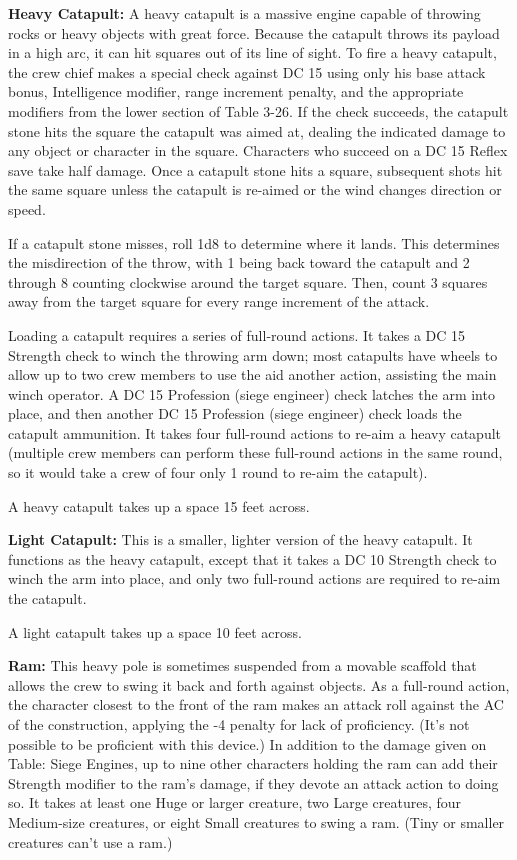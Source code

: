 \textbf{Heavy Catapult:} A heavy catapult is a massive engine capable of throwing 
rocks or heavy objects with great force. Because the catapult throws its payload 
in a high arc, it can hit squares out of its line of sight. To fire a heavy catapult, 
the crew chief makes a special check against DC 15 using only his base attack bonus, 
Intelligence modifier, range increment penalty, and the appropriate modifiers from 
the lower section of Table 3-26. If the check succeeds, the catapult stone hits 
the square the catapult was aimed at, dealing the indicated damage to any object 
or character in the square. Characters who succeed on a DC 15 Reflex save take 
half damage. Once a catapult stone hits a square, subsequent shots hit the same 
square unless the catapult is re-aimed or the wind changes direction or speed.

If a catapult stone misses, roll 1d8 to determine where it lands. This determines 
the misdirection of the throw, with 1 being back toward the catapult and 2 through 
8 counting clockwise around the target square. Then, count 3 squares away from 
the target square for every range increment of the attack.

Loading a catapult requires a series of full-round actions. It takes a DC 15 Strength 
check to winch the throwing arm down; most catapults have wheels to allow up to 
two crew members to use the aid another action, assisting the main winch operator. 
A DC 15 Profession (siege engineer) check latches the arm into place, and then 
another DC 15 Profession (siege engineer) check loads the catapult ammunition. 
It takes four full-round actions to re-aim a heavy catapult (multiple crew members 
can perform these full-round actions in the same round, so it would take a crew 
of four only 1 round to re-aim the catapult).

A heavy catapult takes up a space 15 feet across.

\textbf{Light Catapult:} This is a smaller, lighter version of the heavy catapult. 
It functions as the heavy catapult, except that it takes a DC 10 Strength check 
to winch the arm into place, and only two full-round actions are required to re-aim 
the catapult.

A light catapult takes up a space 10 feet across.

\textbf{Ram:} This heavy pole is sometimes suspended from a movable scaffold that 
allows the crew to swing it back and forth against objects. As a full-round action, 
the character closest to the front of the ram makes an attack roll against the 
AC of the construction, applying the -4 penalty for lack of proficiency. (It's 
not possible to be proficient with this device.) In addition to the damage given 
on Table: Siege Engines, up to nine other characters holding the ram can add their 
Strength modifier to the ram's damage, if they devote an attack action to doing 
so. It takes at least one Huge or larger creature, two Large creatures, four Medium-size 
creatures, or eight Small creatures to swing a ram. (Tiny or smaller creatures 
can't use a ram.)

